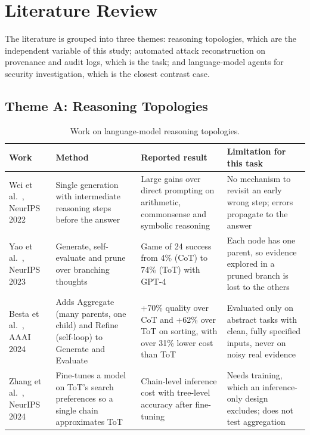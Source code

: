 \chapter{Literature Review}
\label{ch:lit}

The literature is grouped into three themes: reasoning topologies, which are the independent variable of this study; automated attack reconstruction on provenance and audit logs, which is the task; and language-model agents for security investigation, which is the closest contrast case.

\section{Theme A: Reasoning Topologies}
\begin{table}[H]
\centering
\caption{Work on language-model reasoning topologies.}
\label{tab:lit-a}
\footnotesize
\begin{tabularx}{\textwidth}{@{}>{\raggedright\arraybackslash}p{2.5cm} >{\raggedright\arraybackslash}p{3.2cm} Y Y@{}}
\toprule
\textbf{Work} & \textbf{Method} & \textbf{Reported result} & \textbf{Limitation for this task} \\
\midrule
Wei et al.~\cite{wei2022cot}, NeurIPS 2022 & Single generation with intermediate reasoning steps before the answer & Large gains over direct prompting on arithmetic, commonsense and symbolic reasoning & No mechanism to revisit an early wrong step; errors propagate to the answer \\
Yao et al.~\cite{yao2023tot}, NeurIPS 2023 & Generate, self-evaluate and prune over branching thoughts & Game of 24 success from 4\% (CoT) to 74\% (ToT) with GPT-4 & Each node has one parent, so evidence explored in a pruned branch is lost to the others \\
Besta et al.~\cite{besta2024got}, AAAI 2024 & Adds Aggregate (many parents, one child) and Refine (self-loop) to Generate and Evaluate & +70\% quality over CoT and +62\% over ToT on sorting, with over 31\% lower cost than ToT & Evaluated only on abstract tasks with clean, fully specified inputs, never on noisy real evidence \\
Zhang et al.~\cite{zhang2024cpo}, NeurIPS 2024 & Fine-tunes a model on ToT's search preferences so a single chain approximates ToT & Chain-level inference cost with tree-level accuracy after fine-tuning & Needs training, which an inference-only design excludes; does not test aggregation \\
\bottomrule
\end{tabularx}
\end{table}

